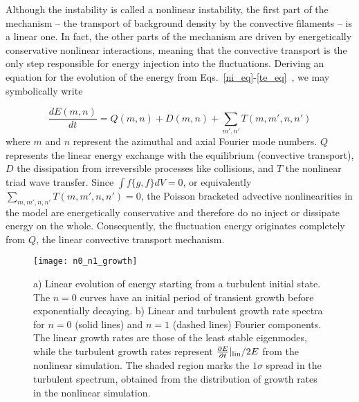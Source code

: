 \documentclass[letter,scriptaddress,twocolumn, prl,showkeys]{revtex4}
\def\beq{\begin{equation}}
\def\eeq{\end{equation}}
\newcommand{\diff}[2]{\frac{d#1}{d#2}}
\newcommand{\pdiff}[2]{\frac{\partial#1}{\partial#2}}
\begin{document}
Although the instability is called a nonlinear instability, the first part of the mechanism -- the transport of background density by the convective filaments -- is a linear one.
In fact, the other parts of the mechanism are driven by energetically conservative nonlinear interactions, 
meaning that the convective transport is the only step responsible for energy injection into the fluctuations.
Deriving an equation for the evolution of the energy from Eqs.~\ref{ni_eq}-\ref{te_eq}~\cite{friedman2012b,friedman2013}, we may symbolically write

\beq
\label{dEdt_def}
\diff{E(m,n)}{t} = Q(m,n) + D(m,n) + \sum_{m',n'} T(m,m',n,n')
\eeq
where $m$ and $n$ represent the azimuthal and axial Fourier mode numbers. 
$Q$ represents the linear energy exchange with the equilibrium (convective transport), $D$ the dissipation from irreversible processes
like collisions, and $T$ the nonlinear triad wave transfer. Since $\int f \{g,f\} dV = 0$, or equivalently $\sum_{m,m',n,n'} T(m,m',n,n')=0$, 
the Poisson bracketed advective nonlinearities in the model are energetically conservative and therefore do no inject or dissipate energy on the whole.
Consequently, the fluctuation energy originates completely from $Q$, the linear convective transport mechanism.

\begin{figure}
\centerline{\texttt{[image: n0\_n1\_growth]}}
\caption{a) Linear evolution of energy starting from a turbulent initial state. The $n=0$ curves have an initial period of transient growth before exponentially decaying.
b) Linear and turbulent growth rate spectra for $n=0$ (solid lines) and $n=1$ (dashed lines) Fourier components. The linear growth rates are those of the least stable eigenmodes,
while the turbulent growth rates represent $\pdiff{E}{t}|_{\rm{lin}}/2 E$ from the nonlinear simulation. The shaded region marks the $1 \sigma$ spread in the turbulent spectrum,
obtained from the distribution of growth rates in the nonlinear simulation.}
\label{n0_n1_growth}
\end{figure}
\end{document}
